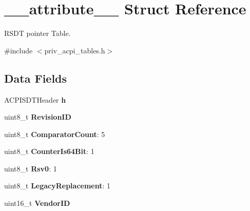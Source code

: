 \hypertarget{struct____attribute____}{}\section{\+\_\+\+\_\+attribute\+\_\+\+\_\+ Struct Reference}
\label{struct____attribute____}


R\+S\+DT pointer Table.  




{\ttfamily \#include $<$priv\+\_\+acpi\+\_\+tables.\+h$>$}

\subsection*{Data Fields}
\begin{DoxyCompactItemize}
\item 
A\+C\+P\+I\+S\+D\+T\+Header {\bfseries h}\hypertarget{struct____attribute_____a5670e0c97ea63cf301c870ea509002e7}{}\label{struct____attribute_____a5670e0c97ea63cf301c870ea509002e7}

\item 
uint8\+\_\+t {\bfseries Revision\+ID}\hypertarget{struct____attribute_____a11d59d8180946892dd910c63cbe2c261}{}\label{struct____attribute_____a11d59d8180946892dd910c63cbe2c261}

\item 
uint8\+\_\+t {\bfseries Comparator\+Count}\+: 5\hypertarget{struct____attribute_____a08d6a558479e2a4756e900272e31889e}{}\label{struct____attribute_____a08d6a558479e2a4756e900272e31889e}

\item 
uint8\+\_\+t {\bfseries Counter\+Is64\+Bit}\+: 1\hypertarget{struct____attribute_____a736554bc3b492647567a239048edbb80}{}\label{struct____attribute_____a736554bc3b492647567a239048edbb80}

\item 
uint8\+\_\+t {\bfseries Rsv0}\+: 1\hypertarget{struct____attribute_____a0961f9d756c0b64e6093e7e553ab8e77}{}\label{struct____attribute_____a0961f9d756c0b64e6093e7e553ab8e77}

\item 
uint8\+\_\+t {\bfseries Legacy\+Replacement}\+: 1\hypertarget{struct____attribute_____a1b621a2ae596135416d7b71af1682d76}{}\label{struct____attribute_____a1b621a2ae596135416d7b71af1682d76}

\item 
uint16\+\_\+t {\bfseries Vendor\+ID}\hypertarget{struct____attribute_____aa456187fbe2216e07869e1c7f6d69444}{}\label{struct____attribute_____aa456187fbe2216e07869e1c7f6d69444}


\end{DoxyCompactItemize}
